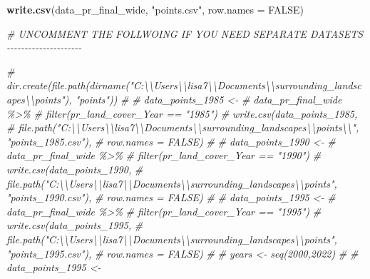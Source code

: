 \documentclass[
]{article}
\newenvironment{Shaded}{\begin{snugshade}}{\end{snugshade}}
\newcommand{\AttributeTok}[1]{\textcolor[rgb]{0.13,0.29,0.53}{#1}}
\newcommand{\CommentTok}[1]{\textcolor[rgb]{0.56,0.35,0.01}{\textit{#1}}}
\newcommand{\ConstantTok}[1]{\textcolor[rgb]{0.56,0.35,0.01}{#1}}
\newcommand{\FunctionTok}[1]{\textcolor[rgb]{0.13,0.29,0.53}{\textbf{#1}}}
\newcommand{\NormalTok}[1]{#1}
\newcommand{\StringTok}[1]{\textcolor[rgb]{0.31,0.60,0.02}{#1}}
\begin{document}
\begin{Shaded}
\begin{Highlighting}[]
\FunctionTok{write.csv}\NormalTok{(data\_pr\_final\_wide, }\StringTok{"points.csv"}\NormalTok{, }\AttributeTok{row.names =} \ConstantTok{FALSE}\NormalTok{)}


\CommentTok{\# UNCOMMENT THE FOLLWOING IF YOU NEED SEPARATE DATASETS {-}{-}{-}{-}{-}{-}{-}{-}{-}{-}{-}{-}{-}{-}{-}{-}{-}{-}{-}{-}{-}}



\CommentTok{\# dir.create(file.path(dirname("C:\textbackslash{}\textbackslash{}Users\textbackslash{}\textbackslash{}lisa7\textbackslash{}\textbackslash{}Documents\textbackslash{}\textbackslash{}surrounding\_landscapes\textbackslash{}\textbackslash{}points"), "points"))}
\CommentTok{\# }
\CommentTok{\# data\_points\_1985 \textless{}{-} }
\CommentTok{\# data\_pr\_final\_wide \%\textgreater{}\% }
\CommentTok{\#   filter(pr\_land\_cover\_Year == "1985")}
\CommentTok{\# write.csv(data\_points\_1985, }
\CommentTok{\#           file.path("C:\textbackslash{}\textbackslash{}Users\textbackslash{}\textbackslash{}lisa7\textbackslash{}\textbackslash{}Documents\textbackslash{}\textbackslash{}surrounding\_landscapes\textbackslash{}\textbackslash{}points\textbackslash{}\textbackslash{}", "points\_1985.csv"), }
\CommentTok{\#           row.names = FALSE)}
\CommentTok{\# }
\CommentTok{\# data\_points\_1990 \textless{}{-} }
\CommentTok{\# data\_pr\_final\_wide \%\textgreater{}\% }
\CommentTok{\#   filter(pr\_land\_cover\_Year == "1990")}
\CommentTok{\# write.csv(data\_points\_1990, }
\CommentTok{\#           file.path("C:\textbackslash{}\textbackslash{}Users\textbackslash{}\textbackslash{}lisa7\textbackslash{}\textbackslash{}Documents\textbackslash{}\textbackslash{}surrounding\_landscapes\textbackslash{}\textbackslash{}points", "points\_1990.csv"), }
\CommentTok{\#           row.names = FALSE)}
\CommentTok{\# }
\CommentTok{\# data\_points\_1995 \textless{}{-} }
\CommentTok{\# data\_pr\_final\_wide \%\textgreater{}\% }
\CommentTok{\#   filter(pr\_land\_cover\_Year == "1995")}
\CommentTok{\# write.csv(data\_points\_1995, }
\CommentTok{\#           file.path("C:\textbackslash{}\textbackslash{}Users\textbackslash{}\textbackslash{}lisa7\textbackslash{}\textbackslash{}Documents\textbackslash{}\textbackslash{}surrounding\_landscapes\textbackslash{}\textbackslash{}points", "points\_1995.csv"), }
\CommentTok{\#           row.names = FALSE)}
\CommentTok{\# }
\CommentTok{\# years \textless{}{-} seq(2000,2022)}
\CommentTok{\# }
\CommentTok{\# data\_points\_1995 \textless{}{-} }

\end{Highlighting}
\end{Shaded}
\end{document}
